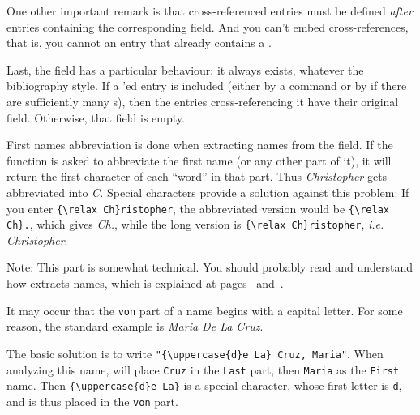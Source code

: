 One other important remark is that cross-referenced entries must be
defined \emph{after} entries containing the corresponding
 field. And you can't embed
cross-references, that is, you cannot  an entry that
already contains a .


Last, the  field has a particular behaviour: it always
exists, whatever the bibliography style. If a 'ed entry
is included (either by a  command or by \bt if there are
sufficiently many s), then the entries cross-referencing
it have their original  field. Otherwise, that field is
empty. 



\label{trucsbib}


First names abbreviation is done when extracting names from the 
field. If the function is asked to abbreviate the first name (or any other part
of it), it will return the first character of each ``word'' in that part. 
Thus \emph{Christopher} gets abbreviated into \emph{C.} Special characters
  provide a solution against this problem: If you enter
  \verb+{\relax Ch}ristopher+, the abbreviated version would be
  \verb+{\relax Ch}.+, which gives \emph{Ch.}, while the long version is
  \verb+{\relax Ch}ristopher+, \emph{i.e.} \emph{{Ch}ristopher}. 


Note: This part is somewhat technical. You should probably read and understand
how \bt extracts names, which is explained at pages~\pageref{noms-start}
and~\pageref{noms-end}. 

It may occur that the \verb+von+ part of a name begins with a capital letter.
For some reason, the standard example is \emph{Maria De La Cruz}. 

The basic solution is to write
\verb+"{\uppercase{d}e La} Cruz, Maria"+. When analyzing this name, \bt will
place \verb+Cruz+ in the
\verb+Last+ part, then \verb+Maria+ as the \verb+First+ name. Then
\verb+{\uppercase{d}e La}+ is a special character,  
whose first letter is \verb+d+, and is thus placed in the \verb+von+ part.

